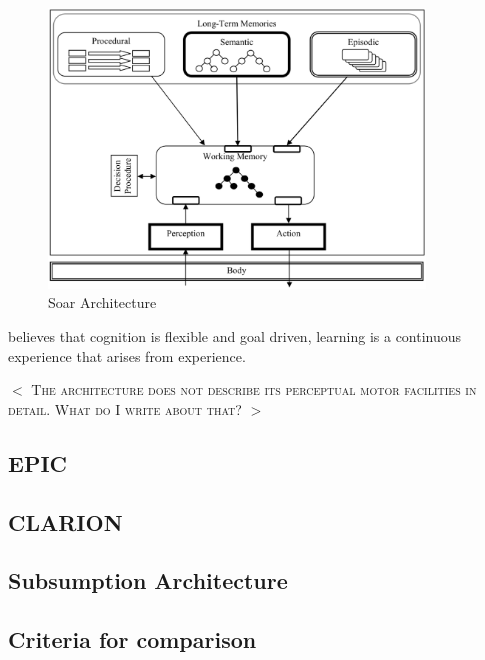 \begin{figure}[htp]
  \centering
  \includegraphics[width=100mm]{soar.eps}
  \caption{Soar Architecture\cite{Jill-Fain-Lehman:2006aa}}
  \label{SOAR_ARCH}
\end{figure}

\soar believes that cognition is flexible and goal driven, learning
is a continuous experience that arises from experience. 
 
$<$ \textsc{The \soar architecture does not describe its perceptual
  motor facilities in detail. What do I write about that?} $>$

\subsection{EPIC}
\subsection{CLARION}
\subsection{Subsumption Architecture}

\subsection{Criteria for comparison}





